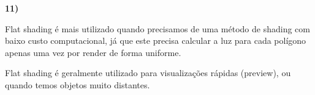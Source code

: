 \textbf{11)} 

Flat shading é mais utilizado quando precisamos de uma método 
de shading com baixo custo computacional, já que este precisa 
calcular a luz para cada polígono apenas uma vez por render de 
forma uniforme.

Flat shading é geralmente utilizado para visualizações rápidas
(preview), ou quando temos objetos muito distantes.

